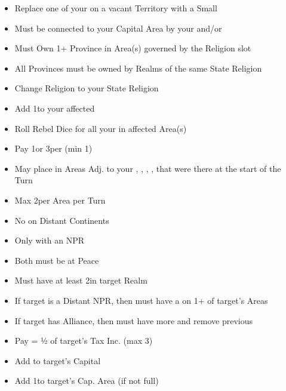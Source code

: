 \documentclass[10pt]{article}
\begin{document}
\begin{itemize}
	\item Replace one of your \claims on a vacant Territory with a Small \town
	\item Must be connected to your Capital Area by your \towns and/or \ships
\end{itemize}

\begin{itemize}
	\item Must Own 1+ Province in Area(s) governed by the Religion slot
	\item All Provinces must be owned by Realms of the same State Religion
	\item Change Religion to your State Religion
	\item Add 1\unrest to your affected \towns
	\item Roll Rebel Dice for all your \unrest in affected Area(s)
\end{itemize}

\begin{itemize}
	\item Pay 1\diplopower or 3\ducats per \influence (min 1\diplopower)
	\item May place \influence in Areas Adj. to your \towns, \vassals, \alliances, \marriages, \influence that were there at the start of the Turn
	\item Max 2\influence per Area per Turn
	\item No \influence on Distant Continents
\end{itemize}

\begin{itemize}
	\item Only with an NPR
	\item Both must be at Peace
	\item Must have at least 2\influence in target Realm
	\item If target is a Distant NPR, then must have a \claim on 1+ of target's Areas
	\item If target has Alliance, then must have more \influence and remove previous \alliance
	\item Pay \diplopower = ½ of target's Tax Inc. (max 3)
	\item Add \alliance to target's Capital
	\item Add 1\influence to target's Cap. Area (if not full)
\end{itemize}
\end{document}
